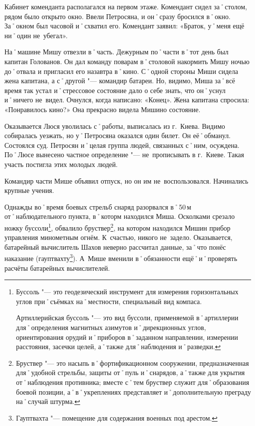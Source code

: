 Кабинет коменданта располагался на первом этаже. Комендант сидел за˚столом, рядом было открыто окно. Ввели Петросяна, и он˚сразу бросился в˚окно. За˚окном был часовой и˚схватил его. Комендант заявил: «Браток, у˚меня ещё ни˚один не~убегал». 

На˚машине Мишу отвезли в˚часть. Дежурным по˚части в˚тот день был капитан Голованов. Он дал команду поварам в˚столовой накормить Мишу ночью до˚отвала и пригласил его назавтра в˚кино. С˚одной стороны Миши сидела жена капитана, а с˚другой "--- командир батареи. Но, видимо, Миша за˚всё время так устал и˚стрессовое состояние дало о себе знать, что он˚уснул и˚ничего не~видел. Очнулся, когда написано: «Конец». Жена капитана спросила: «Понравилось кино?» Она прекрасно видела Мишино состояние. 

Оказывается Люся уволилась с˚работы, выписалась из г.~Киева. Видимо собиралась уезжать, но у˚Петросяна оказался один билет. Он её˚обманул. Состоялся суд. Петросян и˚целая группа людей, связанных с˚ним, осуждена. По˚Люсе вынесено частное определение "--- не~прописывать в г.~Киеве. Такая участь постигла этих молодых людей.

Командир части Мише объявил отпуск, но он им не~воспользовался. Начинались крупные учения. 

Однажды во˚время боевых стрельб снаряд разорвался в˚50\,м от˚наблюдательного пункта, в˚которм находился Миша. Осколками срезало ножку буссоли\footnote{Буссоль "--- это геодезический инструмент для измерения горизонтальных углов при˚съёмках на˚местности, специальный вид компаса. 

Артиллерийская буссоль "--- это вид буссоли, применяемой в˚артиллерии для˚определения магнитных азимутов и˚дирекционных углов, ориентирования орудий и˚приборов в˚заданном направлении, измерении расстояния, засечки целей, а˚также для˚наблюдения и˚разведки.}, обвалило бруствер\footnote{Бруствер "--- это насыпь в˚фортификационном сооружении, предназначенная для˚удобной стрельбы, защиты от˚пуль и˚снарядов, а˚также для укрытия от˚наблюдения противника; вместе с˚тем бруствер служит для˚образования боевой позиции, а˚в˚укреплениях представляет и˚дополнительную преграду на˚случай штурма.}, на котором находился Мишин прибор управления минометным огнём. К~счастью, никого не~задело. Оказывается, батарейный вычислитель Шахов неверно рассчитал данные, за˚что понёс наказание (гауптвахту\footnote{Гауптвахта "--- помещение для содержания военных под арестом.}). А~Мише вменили в˚обязанности ещё˚и˚проверять расчёты батарейных вычислителей. 


